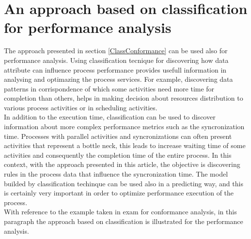 \documentclass[11pt]{article}
\begin{document}
\section{An approach based on classification for performance analysis}\label{ClassPerf}

The approach presented in section \ref{ClassConformance} can be used also for performance analysis. Using classification tecnique for discovering how data attribute can influence process performance provides usefull information in analysing and optimazing the process services. For example, discovering data patterns in corrispondence of which some activities need more time for completion than others, helps in making decision about resources distribution to various process activities or in scheduling activities.\\

In addition to the execution time, classification can be used to discover information about more complex performance metrics such as the syncronization time. Processes with parallel activities and syncronizations can often present activities that represent a bottle neck, this leads to increase waiting time of some activities and consequently the completion time of the entire process. In this context, with the approach presented in this article, the objective is discovering rules in the process data that influence the syncronization time. The model builded by classification techinque can be used also in a predicting way, and this is certainly very important in order to optimize performance execution of the process.\\

With reference to the example taken in exam for conformance analysis, in this paragraph the approach based on classification is illustrated for the performance analysis.
\end{document}
